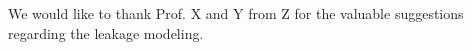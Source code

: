 We would like to thank Prof. X and Y from Z for the valuable suggestions regarding the leakage modeling.
